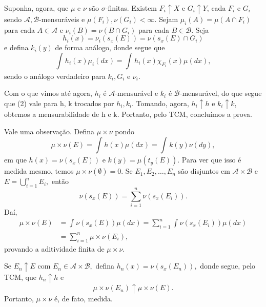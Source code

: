 \documentclass[MeasureTheory/measure_theory.tex]{subfiles}
\begin{document}
\begin{proof*}
	Suponha, agora, que \(\mu \) e \(\nu\) são \(\sigma \)-finitas. Existem \(F_{i}\uparrow X\) e \(G_{i}\uparrow Y\), cada \(F_{i}\) e \(G_{i}\) sendo \(\mathcal{A}, \mathcal{B}\)-mensuráveis e \(\mu (F_{i}), \nu(G_{i})< \infty\).
	Sejam \(\mu_{i}(A) = \mu (A\cap F_{i})\) para cada \(A\in \mathcal{A}\) e \(\nu_{i}(B) = \nu(B\cap G_{i})\) para cada \(B\in \mathcal{B}\). Seja
	\[
		h_{i}(x) = \nu_{i}(s_x(E)) = \nu(s_x(E)\cap G_{i})
	\]
	e defina \(k_{i}(y)\) de forma análogo, donde segue que
	\[
		\int_{}h_{i}(x)\mu_{i}( dx) = \int_{}h_{i}(x)\chi_{F_{i}}(x)\mu ( dx),
	\]
	sendo o análogo verdadeiro para \(k_{i}, G_{i}\) e \(\nu_{i}\).

	Com o que vimos até agora, \(h_{i}\) é \(\mathcal{A}\)-mensurável e \(k_{i}\) é \(\mathcal{B}\)-mensurável, do que segue que (2) vale para h, k trocados por \(h_{i}, k_{i}\). Tomando, agora,
	\(h_{i}\uparrow h\) e \(k_{i}\uparrow k\), obtemos a mensurabilidade de h e k. Portanto, pelo TCM, concluímos a prova. \qedsymbol
\end{proof*}
Vale uma observação. Defina \(\mu \times \nu\) pondo
\[
	\mu \times \nu (E) = \int_{}h(x)\mu ( dx) = \int_{}k(y)\nu( dy),
\]
em que \(h(x) =\nu(s_x(E)) \) e \(k(y) = \mu(t_y(E)).\) Para ver que isso é medida mesmo, temos \(\mu \times \nu(\emptyset ) = 0\). Se \(E_1, E_2, \dotsc , E_{n}\) são disjuntos em \(\mathcal{A}\times \mathcal{B}\) e \(E = \bigcup_{i=1}^{n}E_{i},\) então
\[
	\nu(s_x(E)) = \sum\limits_{i=1}^{n}\nu(s_x(E_{i})).
\]
Daí,
\begin{align*}
	\mu \times \nu(E) & = \int_{}\nu(s_x(E))\mu ( dx) = \sum\limits_{i=1}^{n}\int_{}\nu(s_x(E_{i})) \mu(dx) \\
	                  & = \sum\limits_{i=1}^{n}\mu \times \nu (E_{i}),
\end{align*}
provando a aditividade finita de \(\mu \times \nu\).

Se \(E_{n}\uparrow E\) com \(E_{n}\in \mathcal{A}\times \mathcal{B},\) defina \(h_{n}(x) = \nu(s_x(E_{n})),\) donde segue, pelo TCM, que \(h_{n}\uparrow h\) e
\[
	\mu \times \nu(E_{n})\uparrow \mu \times \nu(E).
\]
Portanto, \(\mu \times \nu\) é, de fato, medida.
\end{document}
